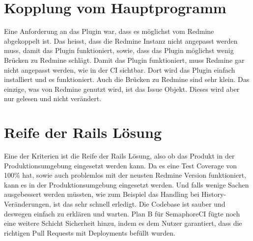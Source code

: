 \section{Kopplung vom Hauptprogramm}
Eine Anforderung an das Plugin war, dass es möglichst vom Redmine abgekoppelt ist. Das heisst, dass die
Redmine Instanz nicht angepasst werden muss, damit das Plugin funktioniert, sowie, dass das Plugin möglichst
wenig Brücken zu Redmine schlägt. \newline
Damit das Plugin funktioniert, muss Redmine gar nicht angepasst werden, wie in der CI sichtbar. Dort wird
das Plugin einfach installiert und es funktioniert. Auch die Brücken zu Redmine sind sehr klein. Das einzige,
was von Redmine genutzt wird, ist das Issue Objekt. Dieses wird aber nur gelesen und nicht verändert.

\newpage
\section{Reife der Rails Lösung}
Eine der Kriterien ist die Reife der Rails Lösung, also ob das Produkt in der Produktionsumgebung
eingesetzt werden kann. \newline
Da es eine Test Coverage von 100\% hat, sowie auch problemlos mit der neusten Redmine Version funktioniert,
kann es in der Produktionsumgebung eingesetzt werden. Und falls wenige Sachen ausgebessert werden müssten,
wie zum Beispiel das Handling bei History-Veränderungen, ist das sehr schnell erledigt. Die Codebase ist
sauber und deswegen einfach zu erklären und warten. \newline
Plan B für SemaphoreCI fügte noch eine weitere Schicht Sicherheit hinzu, indem es dem Nutzer garantiert,
dass die richtigen Pull Requests mit Deployments befüllt wurden.
